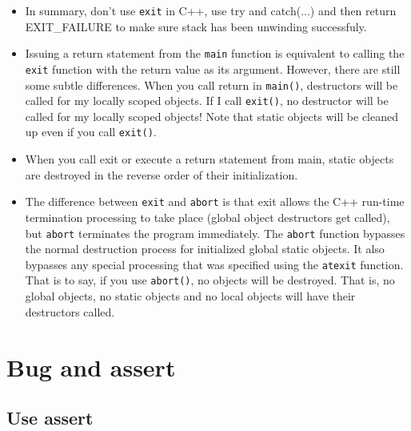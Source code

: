 \documentclass[a4paper,11pt,twoside]{book}
\begin{document}
\begin{itemize}
    \item In summary, don't use \texttt{exit} in C++, use try and catch(...) and then return EXIT\_FAILURE to make sure stack has been unwinding successfuly.     

	\item Issuing a return statement from the \texttt{main} function is equivalent to calling the \texttt{exit} function with the return value as its argument. However, there are still some subtle differences. When you call return in \texttt{main()}, destructors will be called for my locally scoped objects. If I call \texttt{exit()}, no destructor will be called for my locally scoped objects! Note that static objects will be cleaned up even if you call \texttt{exit()}. 
	
    \item When you call exit or execute a return statement from main, static objects are destroyed in the reverse order of their initialization.
	
	\item The difference between \texttt{exit} and \texttt{abort} is that exit allows the C++ run-time termination processing to take place (global object destructors get called), but \texttt{abort} terminates the program immediately. The \texttt{abort} function bypasses the normal destruction process for initialized global static objects. It also bypasses any special processing that was specified using the \texttt{atexit} function. That is to say, if you use \texttt{abort()}, no objects will be destroyed. That is, no global objects, no static objects and no local objects will have their destructors called.
	
\end{itemize}


\section{Bug and assert}
\subsection{Use assert}
\end{document}
